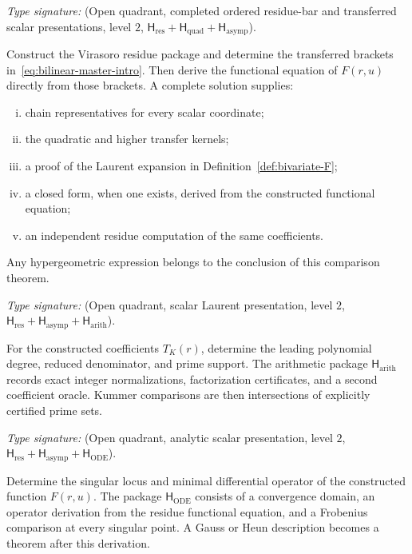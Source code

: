 \begin{problem}
\ClaimStatusOpen
\label{thm:all-tier-bivariate-generating-function}
\label{thm:all-tier-laurent-stratification}
\label{thm:all-tier-closed-form-proved}
\emph{Type signature:}
\textup{(Open quadrant, completed ordered residue-bar and transferred
scalar presentations, level \(2\),
\(\mathsf H_{\mathrm{res}}+\mathsf H_{\mathrm{quad}}
+\mathsf H_{\mathrm{asymp}}\)).}

Construct the Virasoro residue package and determine the transferred
brackets in~\eqref{eq:bilinear-master-intro}.  Then derive the
functional equation of \(F(r,u)\) directly from those brackets.
A complete solution supplies:
\begin{enumerate}[(i)]
\item chain representatives for every scalar coordinate;
\item the quadratic and higher transfer kernels;
\item a proof of the Laurent expansion in
Definition~\ref{def:bivariate-F};
\item a closed form, when one exists, derived from the constructed
functional equation;
\item an independent residue computation of the same coefficients.
\end{enumerate}
Any hypergeometric expression belongs to the conclusion of this
comparison theorem.
\end{problem}

\begin{problem}
\ClaimStatusOpen
\label{cor:tier-k-leading-coefficient}
\label{thm:tier-5-closed-form}
\label{cor:tier-leading-denominator-pattern}
\label{cor:tier-K-kummer-arithmetic}
\emph{Type signature:}
\textup{(Open quadrant, scalar Laurent presentation, level \(2\),
\(\mathsf H_{\mathrm{res}}+\mathsf H_{\mathrm{asymp}}
+\mathsf H_{\mathrm{arith}}\)).}

For the constructed coefficients \(T_K(r)\), determine the leading
polynomial degree, reduced denominator, and prime support.  The
arithmetic package \(\mathsf H_{\mathrm{arith}}\) records exact
integer normalizations, factorization certificates, and a second
coefficient oracle.  Kummer comparisons are then intersections of
explicitly certified prime sets.
\end{problem}

\begin{problem}
\ClaimStatusOpen
\label{thm:all-tier-fuchsian-ode}
\label{cor:three-disjoint-hz-iv-chains}
\emph{Type signature:}
\textup{(Open quadrant, analytic scalar presentation, level \(2\),
\(\mathsf H_{\mathrm{res}}+\mathsf H_{\mathrm{asymp}}
+\mathsf H_{\mathrm{ODE}}\)).}

Determine the singular locus and minimal differential operator of
the constructed function \(F(r,u)\).  The package
\(\mathsf H_{\mathrm{ODE}}\) consists of a convergence domain, an
operator derivation from the residue functional equation, and a
Frobenius comparison at every singular point.  A Gauss or Heun
description becomes a theorem after this derivation.
\end{problem}

